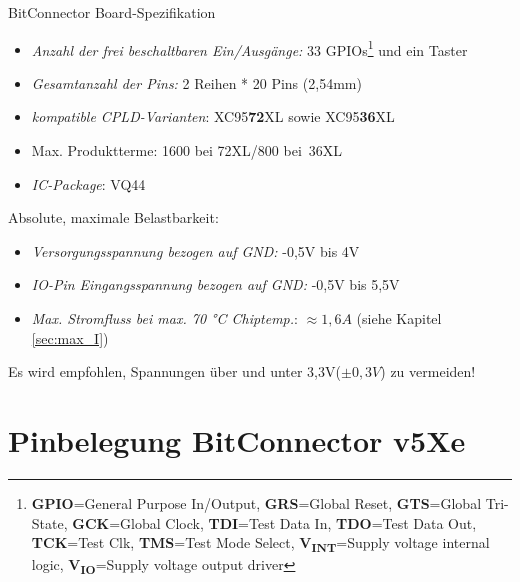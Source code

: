 \documentclass{article}
\begin{document}
BitConnector Board-Spezifikation
\begin{itemize}
	\item \textit{Anzahl der frei beschaltbaren Ein/Ausgänge:} \hspace{0.3cm} 33 GPIOs\footnote{\textbf{GPIO}=General Purpose In/Output, \textbf{GRS}=Global Reset, \textbf{GTS}=Global Tri-State, \textbf{GCK}=Global Clock, \textbf{TDI}=Test Data In, \textbf{TDO}=Test Data Out, \textbf{TCK}=Test Clk, \textbf{TMS}=Test Mode Select, \textbf{V\textsubscript{INT}}=Supply voltage internal logic, \textbf{V\textsubscript{IO}}=Supply voltage output driver} und ein Taster
	\item \textit{Gesamtanzahl der Pins:} \hspace{3.6cm} 2 Reihen * 20 Pins (2,54mm)
	\item \textit{kompatible CPLD-Varianten}: \hspace{2.8cm} XC95\textbf{72}XL sowie XC95\textbf{36}XL
	\item Max. Produktterme: \hspace{4.1cm} 1600 bei 72XL/800 bei~36XL
	\item \textit{IC-Package}: \hspace{5.3cm} VQ44 
\end{itemize}

Absolute, maximale Belastbarkeit:
\begin{itemize}
	\item \textit{Versorgungsspannung bezogen auf GND:} \hspace{1cm} -0,5V bis 4V
	\item \textit{IO-Pin Eingangsspannung bezogen auf GND:} \hspace{0.25cm} -0,5V bis 5,5V
	\item \textit{Max. Stromfluss bei max. 70 \si{\celsius} Chiptemp.}:\hspace{0.6cm} $\approx1,6A$ (siehe Kapitel \ref{sec:max_I})
\end{itemize}

Es wird empfohlen, Spannungen über und unter 3,3V($\pm 0,3V$) zu vermeiden!

\section{Pinbelegung BitConnector v5Xe}
\label{sec:Pins}
\end{document}
